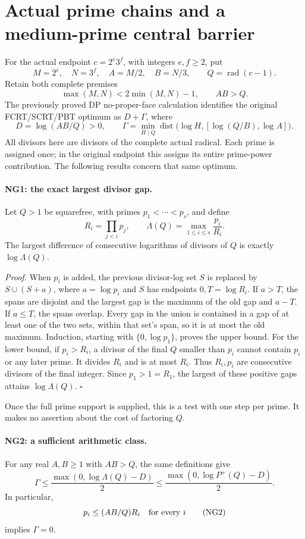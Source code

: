 \section{Actual prime chains and a medium-prime central barrier}
\label{sec-ng18-prime-chain}

For the actual endpoint $c=2^e3^f$, with integers $e,f\geq2$, put
\[
 M=2^e,\quad N=3^f,\quad A=M/2,\quad B=N/3,
 \qquad Q=\operatorname{rad}(c-1).
\]
Retain both complete premises
\[
 \max(M,N)<2\min(M,N)-1,\qquad AB>Q.                 \tag{NG0}
\]
The previously proved DP no-proper-face calculation identifies the
original FCRT/SCRT/PBT optimum as $D+\Gamma$, where
\[
 D=\log(AB/Q)>0,\qquad
 \Gamma=\min_{H\mid Q}\operatorname{dist}
       \bigl(\log H,[\log(Q/B),\log A]\bigr).
\]
All divisors here are divisors of the complete actual radical. Each
prime is assigned once; in the original endpoint this assigns its
entire prime-power contribution. The following results concern that
same optimum.

\paragraph{NG1: the exact largest divisor gap.}
Let $Q>1$ be squarefree, with primes $p_1<\cdots<p_s$, and define
\[
 R_i=\prod_{j<i}p_j,\qquad
 \Lambda(Q)=\max_{1\leq i\leq s}\frac{p_i}{R_i}.
\]
The largest difference of consecutive logarithms of divisors of $Q$
is exactly $\log\Lambda(Q)$.

\emph{Proof.} When $p_i$ is added, the previous divisor-log set $S$
is replaced by $S\cup(S+a)$, where $a=\log p_i$ and $S$ has endpoints
$0,T=\log R_i$. If $a>T$, the spans are disjoint and the largest gap
is the maximum of the old gap and $a-T$. If $a\leq T$, the spans
overlap. Every gap in the union is contained in a gap of at least one
of the two sets, within that set's span, so it is at most the old
maximum. Induction, starting with $\{0,\log p_1\}$, proves the upper
bound.
For the lower bound, if $p_i>R_i$, a divisor of the final $Q$ smaller
than $p_i$ cannot contain $p_i$ or any later prime. It divides $R_i$
and is at most $R_i$. Thus $R_i,p_i$ are consecutive divisors of the
final integer. Since $p_1>1=R_1$, the largest of these positive gaps
attains $\log\Lambda(Q)$. $\square$

Once the full prime support is supplied, this is a test with one
step per prime. It makes no assertion about the cost of factoring $Q$.

\paragraph{NG2: a sufficient arithmetic class.}
For any real $A,B\geq1$ with $AB>Q$, the same definitions give
\[
 \Gamma\leq\frac{\max(0,\log\Lambda(Q)-D)}2
 \leq\frac{\max(0,\log P^+(Q)-D)}2.                 \tag{NG1}
\]
In particular,
\[
 p_i\leq (AB/Q)R_i\quad\hbox{for every }i             \tag{NG2}
\]
implies $\Gamma=0$.

